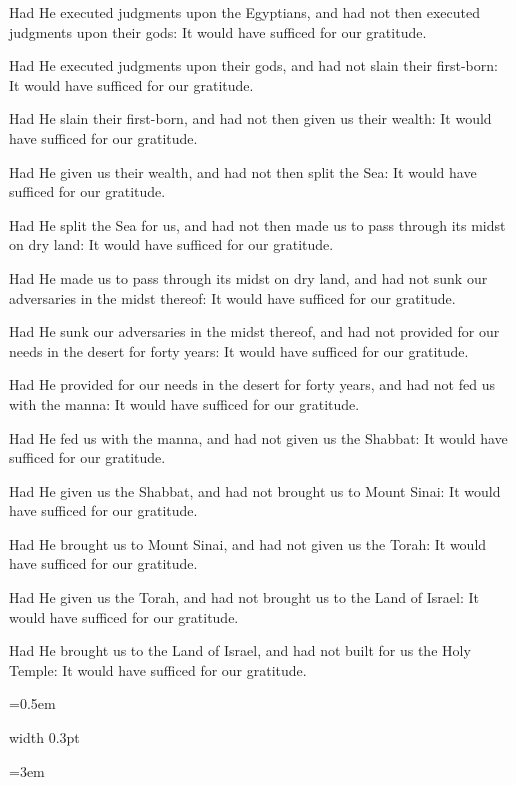 \documentclass[11pt, openany]{book}
\newlength{\bidiHebWidth}
\newlength{\bidiEngWidth}
\newenvironment{bilingual}{%
  \par\vspace{4pt}%
}{%
  \noindent
  \begin{minipage}[t]{\bidiEngWidth}
    \setstretch{1.4}\emergencystretch=0.5em\normalsize
    \usebox{\bidiEngBox}
  \end{minipage}%
  \hfill
  {\color{sedergold}\vrule width 0.3pt}%
  \hfill
  \begin{minipage}[t]{\bidiHebWidth}
    \begingroup\hebrewfont\TeXXeTstate=1\beginR
    \large\setstretch{1.4}\emergencystretch=3em\tolerance=9999\parindent=0pt\relax
    \usebox{\bidiHebBox}
    \endR\endgroup
  \end{minipage}%
  \par\vspace{2pt}%
}
\newenvironment{englishcol}{%
  \begin{lrbox}{\bidiEngBox}\begin{minipage}{\bidiEngWidth}%
}{%
  \end{minipage}\end{lrbox}%
}
\begin{document}
\begin{bilingual}
\begin{englishcol}
Had He executed judgments upon the Egyptians, and had not then executed judgments upon their gods: It would have sufficed for our gratitude.

Had He executed judgments upon their gods, and had not slain their first-born: It would have sufficed for our gratitude.

Had He slain their first-born, and had not then given us their wealth: It would have sufficed for our gratitude.

Had He given us their wealth, and had not then split the Sea: It would have sufficed for our gratitude.

Had He split the Sea for us, and had not then made us to pass through its midst on dry land: It would have sufficed for our gratitude.

Had He made us to pass through its midst on dry land, and had not sunk our adversaries in the midst thereof: It would have sufficed for our gratitude.

Had He sunk our adversaries in the midst thereof, and had not provided for our needs in the desert for forty years: It would have sufficed for our gratitude.

Had He provided for our needs in the desert for forty years, and had not fed us with the manna: It would have sufficed for our gratitude.

Had He fed us with the manna, and had not given us the Shabbat: It would have sufficed for our gratitude.

Had He given us the Shabbat, and had not brought us to Mount Sinai: It would have sufficed for our gratitude.

Had He brought us to Mount Sinai, and had not given us the Torah: It would have sufficed for our gratitude.

Had He given us the Torah, and had not brought us to the Land of Israel: It would have sufficed for our gratitude.

Had He brought us to the Land of Israel, and had not built for us the Holy Temple: It would have sufficed for our gratitude.
\end{englishcol}
\end{bilingual}
\end{document}
